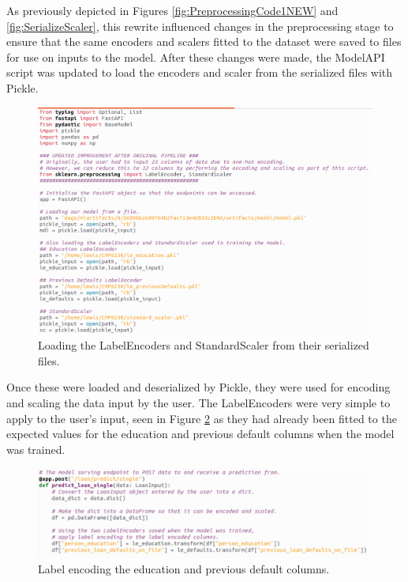 \documentclass[12pt]{report}
\begin{document}
\noindent As previously depicted in Figures \ref{fig:PreprocessingCode1NEW} and \ref{fig:SerializeScaler}, this rewrite influenced changes in 
the preprocessing stage to ensure that the same encoders and scalers fitted to the dataset were saved to files for use on inputs to the model.
After these changes were made, the ModelAPI script was updated to load the encoders and scaler from the serialized files with Pickle.

\begin{figure}[H]
    \centering
    \includegraphics[width=\linewidth]{Implementation/JAN 10 UPDATES/LoadFiles.png}
    \caption{Loading the LabelEncoders and StandardScaler from their serialized files.}
    \label{fig:UviLoadFiles}
\end{figure}

\noindent Once these were loaded and deserialized by Pickle, they were used for encoding and scaling the data input by the user.
The LabelEncoders were very simple to apply to the user's input, seen in Figure \ref{fig:UviLabelEncoding} as they had already 
been fitted to the expected values for the education and previous default columns when the model was trained.

\begin{figure}[H]
    \centering
    \includegraphics[width=\linewidth]{Implementation/JAN 10 UPDATES/NewUviEncoding1.png}
    \caption{Label encoding the education and previous default columns.}
    \label{fig:UviLabelEncoding}
\end{figure}
\end{document}
